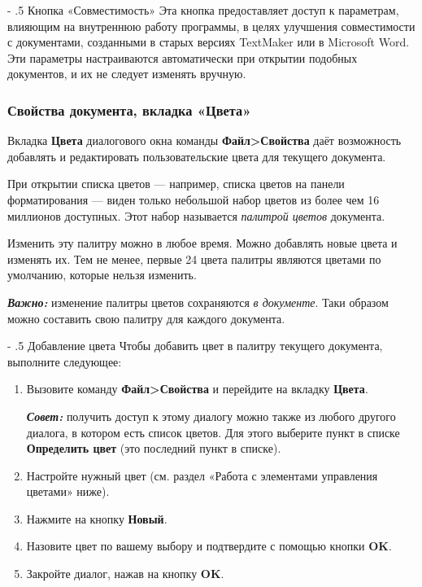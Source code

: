 ﻿\documentclass[a4paper,10pt]{article}
\makeatletter
\renewcommand\paragraph{%
   \@startsection{paragraph}{4}{0mm}%
      {-\baselineskip}%
      {.5\baselineskip}%
      {\normalfont\normalsize\bfseries}}
\makeatother
\begin{document}
\paragraph{Кнопка «Совместимость»}
Эта кнопка предоставляет доступ к параметрам, влияющим на внутреннюю работу программы, в целях улучшения совместимости с документами, созданными в старых версиях TextMaker или в Microsoft Word. Эти параметры настраиваются автоматически при открытии подобных документов, и их не следует изменять вручную.
 
 \subsubsection{Свойства документа, вкладка «Цвета»} \label{sec:свойствадоквклцвета}
 Вкладка \textbf{Цвета} диалогового окна команды \textbf{Файл>Свойства} даёт возможность добавлять и редактировать пользовательские цвета для текущего документа.
 
 При открытии списка цветов — например, списка цветов на панели форматирования — виден только небольшой набор цветов из более чем 16 миллионов доступных. Этот набор называется \textit{палитрой цветов} документа.
 
 Изменить эту палитру можно в любое время. Можно добавлять новые цвета и изменять их. Тем не менее, первые 24 цвета палитры являются цветами по умолчанию, которые нельзя изменить.
 
 \begin{mdframed}[backgroundcolor=blue!10]
\textbf{\textit{Важно:}} изменение палитры цветов сохраняются \textit{в документе}. Таки образом можно составить свою палитру для каждого документа.
\end{mdframed}
 
 \paragraph{Добавление цвета}
 Чтобы добавить цвет в палитру текущего документа, выполните следующее:
 \begin{enumerate}
  \item Вызовите команду \textbf{Файл>Свойства} и перейдите на вкладку \textbf{Цвета}.
  \begin{mdframed}[backgroundcolor=blue!10]
\textbf{\textit{Совет:}} получить доступ к этому диалогу можно также из любого другого диалога, в котором есть список цветов. Для этого выберите пункт в списке \textbf{Определить цвет} (это последний пункт в списке).
\end{mdframed}
\item Настройте нужный цвет (см. раздел «Работа с элементами управления цветами» ниже).
\item Нажмите на кнопку \textbf{Новый}.
\item Назовите цвет по вашему выбору и подтвердите с помощью кнопки \textbf{OK}.
\item Закройте диалог, нажав на кнопку \textbf{OK}.
 \end{enumerate}
\end{document}
